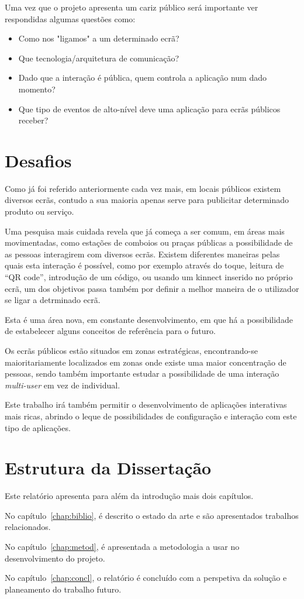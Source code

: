 Uma vez que o projeto apresenta um cariz público será importante ver respondidas algumas questões como:
\begin{itemize}
\item Como nos "ligamos" a um determinado ecrã? 
\item Que tecnologia/arquitetura de comunicação? 
\item Dado que a interação é pública, quem controla a aplicação num dado momento? 
\item Que tipo de eventos de alto-nível deve uma aplicação para ecrãs públicos receber?
\end{itemize}

\section{Desafios} \label{sec:goals}

Como já foi referido anteriormente cada vez mais, em locais públicos existem diversos ecrãs, contudo a sua maioria apenas serve para publicitar determinado produto ou serviço. 

Uma pesquisa mais cuidada revela que já começa a ser comum, em áreas mais movimentadas, como estações de comboios ou praças públicas a possibilidade de as pessoas interagirem com diversos ecrãs. Existem diferentes maneiras pelas quais esta interação é possível, como por exemplo através do toque, leitura de “QR code”, introdução de um código, ou usando um kinnect inserido no próprio ecrã, um dos objetivos passa também por definir a melhor maneira de o utilizador se ligar a detrminado ecrã.

Esta é uma área nova, em constante desenvolvimento, em que há a possibilidade de estabelecer alguns conceitos de referência para o futuro.

Os ecrãs públicos estão situados em zonas estratégicas, encontrando-se maioritariamente localizados em zonas onde existe uma maior concentração de pessoas, sendo também importante estudar a possibilidade de uma interação \textit{multi-user} em vez de individual.

Este trabalho irá também permitir o desenvolvimento de aplicações interativas mais ricas, abrindo o leque de possibilidades de configuração e interação com este tipo de aplicações. 

\section{Estrutura da Dissertação} \label{sec:struct}

Este relatório apresenta para além da introdução mais dois capítulos.

No capítulo~\ref{chap:biblio}, é descrito o estado da arte e são
apresentados trabalhos relacionados. 

No capítulo~\ref{chap:metod}, é apresentada a metodologia a usar no desenvolvimento do projeto.

No capítulo~\ref{chap:concl}, o relatório é concluído com a perspetiva da solução e planeamento do trabalho futuro.
